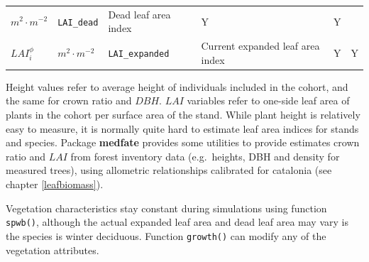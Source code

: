 \documentclass[]{book}
\begin{document}
\begin{longtable}[]{@{}llllll@{}}
\begin{minipage}[t]{0.09\columnwidth}
\(m^2 \cdot m^{-2}\)\strut
\end{minipage} & \begin{minipage}[t]{0.06\columnwidth}\raggedright
\texttt{LAI\_dead}\strut
\end{minipage} & \begin{minipage}[t]{0.43\columnwidth}\raggedright
Dead leaf area index\strut
\end{minipage} & \begin{minipage}[t]{0.07\columnwidth}\raggedright
Y\strut
\end{minipage} & \begin{minipage}[t]{0.07\columnwidth}\raggedright
Y\strut
\end{minipage}\tabularnewline
\begin{minipage}[t]{0.10\columnwidth}\raggedright
\(LAI^{\phi}_i\)\strut
\end{minipage} & \begin{minipage}[t]{0.09\columnwidth}\raggedright
\(m^2 \cdot m^{-2}\)\strut
\end{minipage} & \begin{minipage}[t]{0.06\columnwidth}\raggedright
\texttt{LAI\_expanded}\strut
\end{minipage} & \begin{minipage}[t]{0.43\columnwidth}\raggedright
Current expanded leaf area index\strut
\end{minipage} & \begin{minipage}[t]{0.07\columnwidth}\raggedright
Y\strut
\end{minipage} & \begin{minipage}[t]{0.07\columnwidth}\raggedright
Y\strut
\end{minipage}\tabularnewline
\bottomrule
\end{longtable}

Height values refer to average height of individuals included in the cohort, and the same for crown ratio and \(DBH\). \(LAI\) variables refer to one-side leaf area of plants in the cohort per surface area of the stand. While plant height is relatively easy to measure, it is normally quite hard to estimate leaf area indices for stands and species. Package \textbf{medfate} provides some utilities to provide estimates crown ratio and \(LAI\) from forest inventory data (e.g.~heights, DBH and density for measured trees), using allometric relationships calibrated for catalonia (see chapter \ref{leafbiomass}).

Vegetation characteristics stay constant during simulations using function \texttt{spwb()}, although the actual expanded leaf area and dead leaf area may vary is the species is winter deciduous. Function \texttt{growth()} can modify any of the vegetation attributes.
\end{document}
